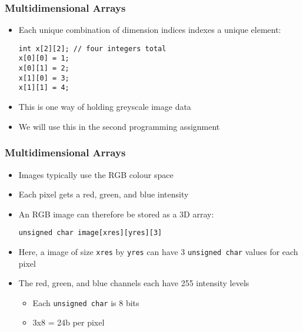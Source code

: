 \documentclass[14pt]{beamer}
\begin{document}
\begin{frame}[fragile]
\frametitle{Multidimensional Arrays}
\begin{itemize}
\item Each unique combination of dimension indices indexes a unique element:
\begin{lstlisting}[style=CStyle]
int x[2][2]; // four integers total
x[0][0] = 1;
x[0][1] = 2;
x[1][0] = 3;
x[1][1] = 4;
\end{lstlisting}
\item This is one way of holding greyscale image data
\item We will use this in the second programming assignment
\end{itemize}
\end{frame}

\begin{frame}[fragile]
\frametitle{Multidimensional Arrays}
\begin{itemize}
\item Images typically use the RGB colour space
\item Each pixel gets a red, green, and blue intensity
\item An RGB image can therefore be stored as a 3D array:
\begin{lstlisting}[style=CStyle]
unsigned char image[xres][yres][3]
\end{lstlisting}
\item Here, a image of size \texttt{xres} by \texttt{yres} can have 3 \texttt{unsigned char} values for each pixel
\item The red, green, and blue channels each have 255 intensity levels
	\begin{itemize}
		\item Each \texttt{unsigned char} is 8 bits
		\item 3x8 = 24b per pixel
	\end{itemize}
\end{itemize}
\end{frame}
\end{document}
